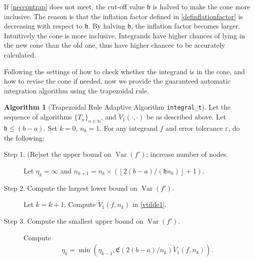 \documentclass{iitthesis}
\DeclareMathOperator{\Var}{Var}
\theoremstyle{definition}
\newtheorem{algo}{Algorithm}
\theoremstyle{remark}
\begin{document}
If \eqref{neccontrap} does not meet, the cut-off value $\mathfrak{h}$ is halved to make the cone more inclusive. The reason is that the inflation factor defined in \eqref{definflationfactor} is decreasing with respect to $\mathfrak{h}$. By halving $\mathfrak{h}$, the inflation factor becomes larger. Intuitively the cone is more inclusive. Integrands have higher chances of lying in the new cone than the old one, thus have higher chancec to be accurately calculated.

Following the settings of how to check whether the integrand is in the cone, and how to revise the cone if needed, now we provide the guaranteed automatic integration algorithm using the trapezoidal rule.
\begin{algo}[Trapezoidal Rule Adaptive Algorithm {\tt integral\_t}] \label{multistagetrapalgo}
Let the sequence of algorithms $\{T_n\}_{n\in \mathbb{N}}$, %
and $\widetilde{V}_1(\cdot,\cdot)$ be as described above.
Let $\mathfrak{h}\le (b-a)$. Set $k=0$, $n_{k}=1$. For any integrand $f$ and error tolerance $\varepsilon$, do the following: %
\begin{description}
\item[Step 1. (Re)set the upper bound on $\Var(f')$; increase number of nodes.] Let $\eta_{k}=\infty$ and $n_{k+1}=n_k\times\left(\left\lfloor2(b-a)/(\mathfrak{h}n_{k})\right\rfloor+1\right)$.

\item[Step 2. Compute the largest lower bound on {$\Var(f')$}.] Let $k=k+1$. Compute  $\widetilde{V}_1(f,n_k)$ in \eqref{vtilde1}.%

\item[Step 3. Compute the smallest upper bound on {$\Var(f')$}.] Compute
    \begin{align*}
        \eta_{k}=\min\left(\eta_{k-1},\mathfrak{C}(2(b-a)/n_{k})\widetilde{V}_1(f,n_k)\right).
    \end{align*}


\end{description}
\end{algo}
\end{document}

